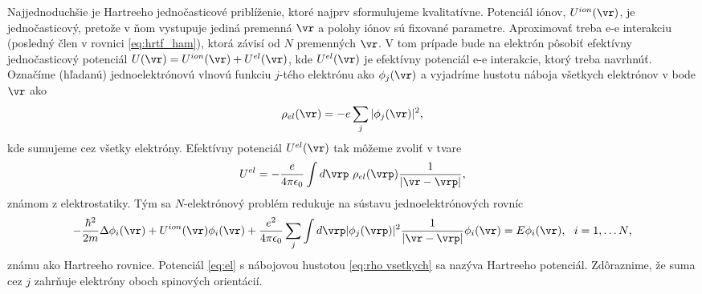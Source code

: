 Najjednoduchšie je Hartreeho jednočasticové priblíženie, ktoré najprv sformulujeme kvalitatívne.
Potenciál iónov, $U^{ion}(\vr)$, je jednočasticový, pretože v ňom vystupuje jediná premenná $\vr$ a polohy iónov sú fixované parametre.
Aproximovať treba e-e interakciu (posledný člen v rovnici \ref{eq:hrtf_ham}), ktorá závisí od $N$ premenných $\vr$.
V tom prípade bude na elektrón pôsobiť efektívny jednočasticový potenciál $U(\vr)=U^{ion}(\vr)+U^{el}(\vr)$, kde $U^{el}(\vr)$ je efektívny potenciál e-e interakcie, ktorý treba navrhnúť.
Označíme (hľadanú) jednoelektrónovú vlnovú funkciu $j$-tého elektrónu ako  $\phi_j(\vr)$ a vyjadríme hustotu náboja všetkych elektrónov v bode $\vr$ ako
\begin{equation}
 \label{eq:rho vsetkych}
 \rho_{el}(\vr)=-e \sum_j |\phi_j(\vr)|^2\text{,}
\end{equation}
kde sumujeme cez všetky elektróny. Efektívny potenciál $U^{el}(\vr)$  tak môžeme zvoliť v tvare
\begin{equation}
 \label{eq:el}
 U^{el}=-\frac{e}{4\pi \epsilon_0} \int d\vrp\ \rho_{el}(\vrp) \frac {1}{|\vr-\vrp|} \text{,}
\end{equation}
známom z elektrostatiky. Tým sa $N$-elektrónový problém redukuje na sústavu jednoelektrónových rovníc
\begin{equation}
 \label{eq:hrt}
 -\frac{\hbar^2}{2m}\Delta \phi_i(\vr)+U^{ion}(\vr)\phi_i(\vr)+\frac{e^2}{4 \pi \epsilon_0}\sum_j{\int d \vrp |\phi_j(\vrp)|^2\frac {1}{|\vr-\vrp|}}\phi_i(\vr)=E\phi_i(\vr) , \ \ i =1, \dots N \text{,}
\end{equation}
známu ako Hartreeho rovnice. Potenciál \eqref{eq:el} s nábojovou hustotou \eqref{eq:rho vsetkych} sa nazýva Hartreeho potenciál. Zdôraznime, že suma cez $j$ zahrňuje elektróny oboch spinových orientácií.

